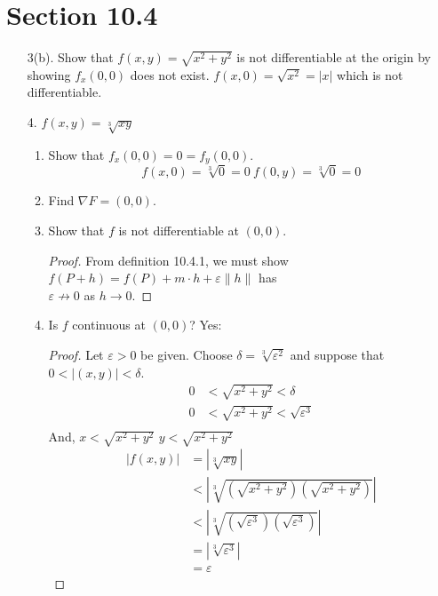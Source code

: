 \documentclass[hidelinks,12pt]{article}
\begin{document}
\section{Section 10.4}
\begin{enumerate}
    \item[3(b).] Show that $f(x,y)=\sqrt{x^2+y^2}$ is not differentiable at the origin by showing $f_x(0,0)$ does not exist. $f(x,0)=\sqrt{x^2}=|x|$ which is not differentiable.
    \item[4.] $f(x,y)=\sqrt[3]{xy}$
        \begin{enumerate}
            \item Show that $f_x(0,0)=0=f_y(0,0)$.
                \[f(x,0)=\sqrt[3]{0}=0\ f(0,y)=\sqrt[3]{0}=0\]
            \item Find $\nabla F=(0,0)$.
            \item Show that $f$ is not differentiable at $(0,0)$.
                \begin{proof}
                    From definition 10.4.1, we must show $f(P+h)=f(P)+m\cdot h+\varepsilon\|h\|$ has \\$\varepsilon\not\to0$ as $h\to0$.
                \end{proof}
            \item Is $f$ continuous at $(0,0)$? Yes:
                \begin{proof}
                    Let $\varepsilon>0$ be given. Choose $\delta=\sqrt[3]{\varepsilon^2}$ and suppose that $0<|(x,y)|<\delta$.
                    \begin{align*}
                        0 &<\sqrt{x^2+y^2}<\delta\\
                        0 &<\sqrt{x^2+y^2}<\sqrt{\varepsilon^3}\\
                    \end{align*}
                    And, $x<\sqrt{x^2+y^2}$ $y<\sqrt{x^2+y^2}$
                    \begin{align*}
                        |f(x,y)|&=|\sqrt[3]{xy}|\\
                                &<|\sqrt[3]{(\sqrt{x^2+y^2})(\sqrt{x^2+y^2})}|\\
                                &<|\sqrt[3]{(\sqrt{\varepsilon^3})(\sqrt{\varepsilon^3})}|\\
                                &=|\sqrt[3]{\varepsilon^3}|\\
                                &=\varepsilon
                    \end{align*}
                \end{proof}
        \end{enumerate}
\end{enumerate}
\end{document}
